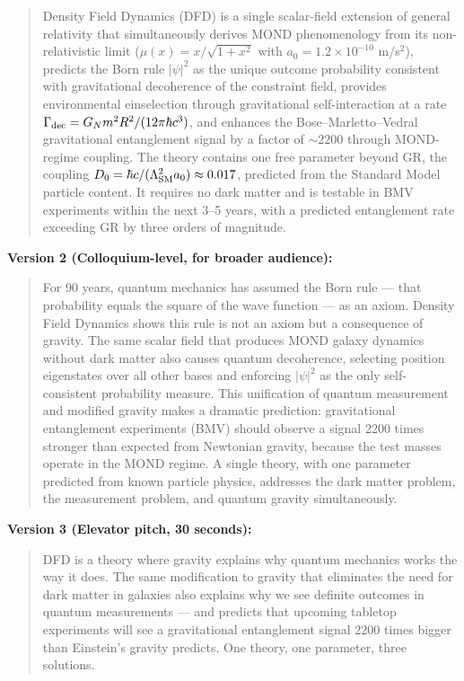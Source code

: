 \documentclass[11pt,a4paper]{article}
\begin{document}
\begin{quote}
Density Field Dynamics (DFD) is a single scalar-field extension of general relativity that simultaneously derives MOND phenomenology from its non-relativistic limit ($\mu(x) = x/\sqrt{1+x^2}$ with $a_0 = 1.2\times10^{-10}$ m/s$^2$), predicts the Born rule $|\psi|^2$ as the unique outcome probability consistent with gravitational decoherence of the constraint field, provides environmental einselection through gravitational self-interaction at a rate $\Gamma_{\rm dec} = G_Nm^2R^2/(12\pi\hbar c^3)$, and enhances the Bose--Marletto--Vedral gravitational entanglement signal by a factor of $\sim 2200$ through MOND-regime coupling. The theory contains one free parameter beyond GR, the coupling $D_0 = \hbar c/(\Lambda_{\rm SM}^2 a_0) \approx 0.017$, predicted from the Standard Model particle content. It requires no dark matter and is testable in BMV experiments within the next 3--5 years, with a predicted entanglement rate exceeding GR by three orders of magnitude.
\end{quote}

\textbf{Version 2 (Colloquium-level, for broader audience):}

\begin{quote}
For 90 years, quantum mechanics has assumed the Born rule --- that probability equals the square of the wave function --- as an axiom. Density Field Dynamics shows this rule is not an axiom but a consequence of gravity. The same scalar field that produces MOND galaxy dynamics without dark matter also causes quantum decoherence, selecting position eigenstates over all other bases and enforcing $|\psi|^2$ as the only self-consistent probability measure. This unification of quantum measurement and modified gravity makes a dramatic prediction: gravitational entanglement experiments (BMV) should observe a signal 2200 times stronger than expected from Newtonian gravity, because the test masses operate in the MOND regime. A single theory, with one parameter predicted from known particle physics, addresses the dark matter problem, the measurement problem, and quantum gravity simultaneously.
\end{quote}

\textbf{Version 3 (Elevator pitch, 30 seconds):}

\begin{quote}
DFD is a theory where gravity explains why quantum mechanics works the way it does. The same modification to gravity that eliminates the need for dark matter in galaxies also explains why we see definite outcomes in quantum measurements --- and predicts that upcoming tabletop experiments will see a gravitational entanglement signal 2200 times bigger than Einstein's gravity predicts. One theory, one parameter, three solutions.
\end{quote}
\end{document}
